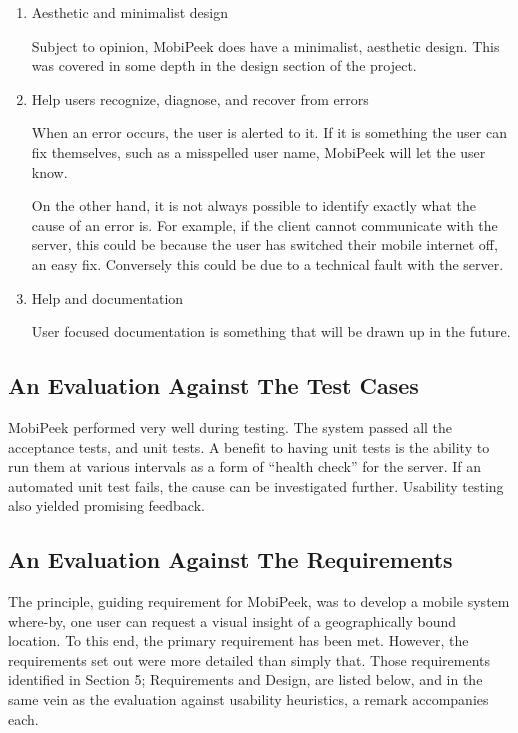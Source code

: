 \documentclass[a4paper]{article}
\begin{document}
\begin{enumerate}
\item Aesthetic and minimalist design

Subject to opinion, MobiPeek does have a minimalist, aesthetic design. This was covered in some depth in the design section of the project.

\item Help users recognize, diagnose, and recover from errors

When an error occurs, the user is alerted to it. If it is something the user can fix themselves, such as a misspelled user name, MobiPeek will let the user know.

On the other hand, it is not always possible to identify exactly what the cause of an error is. For example, if the client cannot communicate with the server, this could be because the user has switched their mobile internet off, an easy fix. Conversely this could be due to a technical fault with the server.

\item Help and documentation

User focused documentation is something that will be drawn up in the future. 
\end{enumerate}
\subsection{An Evaluation Against The Test Cases}

MobiPeek performed very well during testing. The system passed all the acceptance tests, and unit tests. A benefit to having unit tests is the ability to run them at various intervals as a form of ``health check'' for the server. If an automated unit test fails, the cause can be investigated further. Usability testing also yielded promising feedback.

\subsection{An Evaluation Against The Requirements}

The principle, guiding requirement for MobiPeek, was to develop a mobile system where-by, one user can request a visual insight of a geographically bound location. To this end, the primary requirement has been met. However, the requirements set out were more detailed than simply that. Those requirements identified in Section 5; Requirements and Design, are listed below, and in the same vein as the evaluation against usability heuristics, a remark accompanies each.
\end{document}
